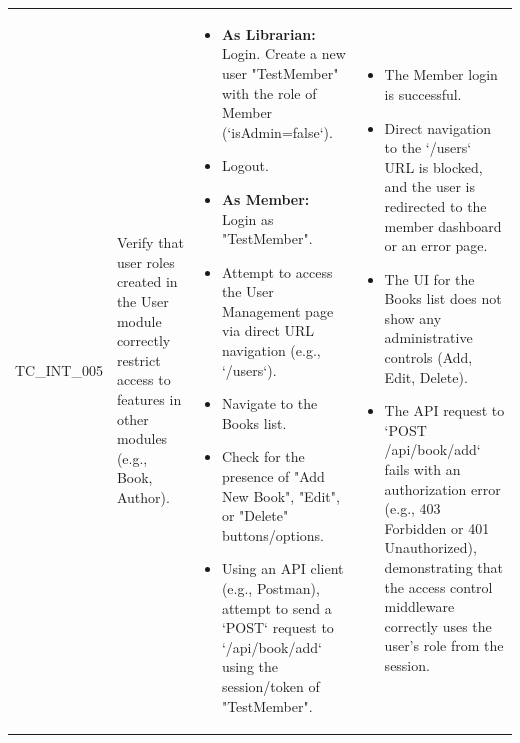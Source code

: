 \begin{longtable}{|>{\scriptsize\raggedright\arraybackslash}p{2cm}|>{\raggedright\arraybackslash}p{4cm}|>{\raggedright\arraybackslash}p{5cm}|>{\raggedright\arraybackslash}p{4.5cm}|}
\multicolumn{4}{|l|}{\textbf{Scenario: Role-Based Access Control (RBAC) Integration}} \\ \hline
TC\_INT\_005 & Verify that user roles created in the User module correctly restrict access to features in other modules (e.g., Book, Author). &
    \begin{itemize}[noitemsep, topsep=0pt, partopsep=0pt, leftmargin=*]
        \item \textbf{As Librarian:} Login. Create a new user "TestMember" with the role of Member (`isAdmin=false`).
        \item Logout.
        \item \textbf{As Member:} Login as "TestMember".
        \item Attempt to access the User Management page via direct URL navigation (e.g., `/users`).
        \item Navigate to the Books list.
        \item Check for the presence of "Add New Book", "Edit", or "Delete" buttons/options.
        \item Using an API client (e.g., Postman), attempt to send a `POST` request to `/api/book/add` using the session/token of "TestMember".
    \end{itemize} & 
    \begin{itemize}[noitemsep, topsep=0pt, partopsep=0pt, leftmargin=*]
        \item The Member login is successful.
        \item Direct navigation to the `/users` URL is blocked, and the user is redirected to the member dashboard or an error page.
        \item The UI for the Books list does not show any administrative controls (Add, Edit, Delete).
        \item The API request to `POST /api/book/add` fails with an authorization error (e.g., 403 Forbidden or 401 Unauthorized), demonstrating that the access control middleware correctly uses the user's role from the session.
    \end{itemize} \\ \hline

\end{longtable}